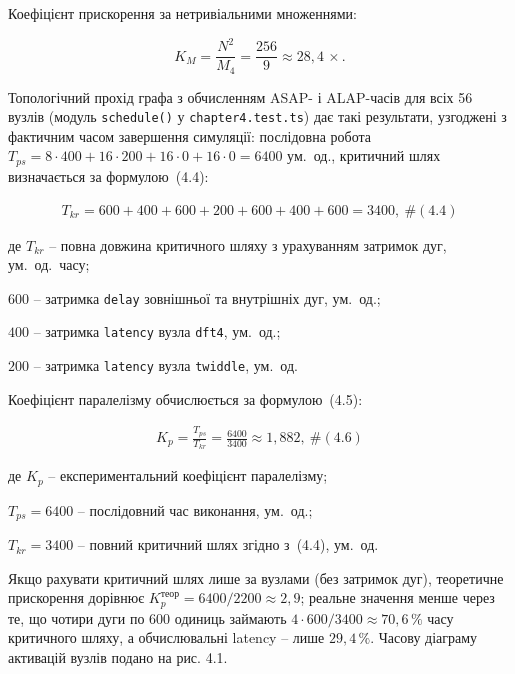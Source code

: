 \documentclass[
]{article}
\newcommand{\passthrough}[1]{#1}
\begin{document}
Коефіцієнт прискорення за нетривіальними множеннями:

\[K_{M} = \frac{N^{2}}{M_{4}} = \frac{256}{9} \approx 28,4\, \times .\]

Топологічний прохід графа з обчисленням ASAP- і ALAP-часів для всіх 56
вузлів (модуль
\passthrough{\lstinline!schedule!}\passthrough{\lstinline!()!} у
\passthrough{\lstinline!chapter!}\passthrough{\lstinline!4.!}\passthrough{\lstinline!test!}\passthrough{\lstinline!.!}\passthrough{\lstinline!ts!})
дає такі результати, узгоджені з фактичним часом завершення симуляції:
послідовна робота
\(T_{ps} = 8 \cdot 400 + 16 \cdot 200 + 16 \cdot 0 + 16 \cdot 0 = 6400\)
ум.~од., критичний шлях визначається за формулою~(4.4):

\[\begin{array}{r}
T_{kr} = 600 + 400 + 600 + 200 + 600 + 400 + 600 = 3400,\ \#(4.4)
\end{array}\]

де \(T_{kr}\) -- повна довжина критичного шляху з урахуванням затримок
дуг, ум.~од.~часу;

\(600\) -- затримка \passthrough{\lstinline!delay!} зовнішньої та
внутрішніх дуг, ум.~од.;

\(400\) -- затримка \passthrough{\lstinline!latency!} вузла
\passthrough{\lstinline!dft4!}, ум.~од.;

\(200\) -- затримка \passthrough{\lstinline!latency!} вузла
\passthrough{\lstinline!twiddle!}, ум.~од.

Коефіцієнт паралелізму обчислюється за формулою~(4.5):

\[\begin{array}{r}
K_{p} = \frac{T_{ps}}{T_{kr}} = \frac{6400}{3400} \approx 1,882,\ \#(4.6)
\end{array}\]

де \(K_{p}\) -- експериментальний коефіцієнт паралелізму;

\(T_{ps} = 6400\) -- послідовний час виконання, ум.~од.;

\(T_{kr} = 3400\) -- повний критичний шлях згідно з~(4.4), ум.~од.

Якщо рахувати критичний шлях лише за вузлами (без затримок дуг),
теоретичне прискорення дорівнює
\(K_{p}^{\text{теор}} = 6400/2200 \approx 2,9\); реальне значення менше
через те, що чотири дуги по 600 одиниць займають
\(4 \cdot 600/3400 \approx 70,6\,\%\) часу критичного шляху, а
обчислювальні latency -- лише \(29,4\,\%\). Часову діаграму активацій
вузлів подано на рис. 4.1.


\end{document}
